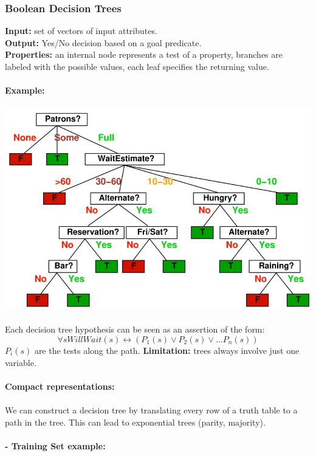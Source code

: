 \documentclass{article}
\begin{document}
\subsubsection{Boolean Decision Trees}
\textbf{Input: }set of vectors of input attributes.\\
\textbf{Output: }Yes/No decision based on a goal predicate.\\
\textbf{Properties:  }an internal node represents a test of a property, branches are labeled with the possible values, each leaf specifies the returning value.\\\\
\textbf{Example: }\\\\
\includegraphics[scale=0.3]{84.png}\\\\
Each decision tree hypothesis can be seen as an assertion of the form:
\begin{equation}
\forall s WillWait(s)\leftrightarrow (P_1(s)\vee P_2(s)\vee ... P_n(s))
\end{equation}
$P_i(s)$ are the tests along the path. \textbf{Limitation:} trees always involve just one variable.\\\\
\textbf{Compact representations: }\\\\
We can construct a decision tree by translating every row of a truth table to a path in the tree. This can lead to exponential trees (parity, majority).\\\\
\textbf{- Training Set example:}\\\\
\end{document}

